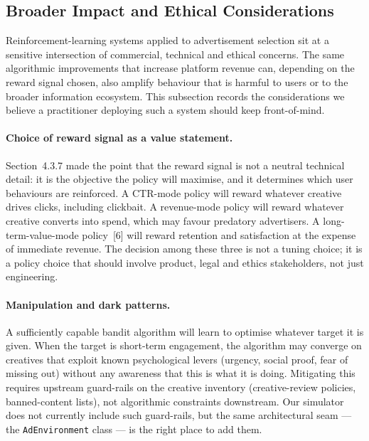 \subsection{Broader Impact and Ethical Considerations}
Reinforcement-learning systems applied to advertisement selection sit at a sensitive intersection of commercial, technical and ethical concerns. The same algorithmic improvements that increase platform revenue can, depending on the reward signal chosen, also amplify behaviour that is harmful to users or to the broader information ecosystem. This subsection records the considerations we believe a practitioner deploying such a system should keep front-of-mind.

\paragraph{Choice of reward signal as a value statement.}
Section~4.3.7 made the point that the reward signal is not a neutral technical detail: it is the objective the policy will maximise, and it determines which user behaviours are reinforced. A CTR-mode policy will reward whatever creative drives clicks, including clickbait. A revenue-mode policy will reward whatever creative converts into spend, which may favour predatory advertisers. A long-term-value-mode policy~[6] will reward retention and satisfaction at the expense of immediate revenue. The decision among these three is not a tuning choice; it is a policy choice that should involve product, legal and ethics stakeholders, not just engineering.

\paragraph{Manipulation and dark patterns.}
A sufficiently capable bandit algorithm will learn to optimise whatever target it is given. When the target is short-term engagement, the algorithm may converge on creatives that exploit known psychological levers (urgency, social proof, fear of missing out) without any awareness that this is what it is doing. Mitigating this requires upstream guard-rails on the creative inventory (creative-review policies, banned-content lists), not algorithmic constraints downstream. Our simulator does not currently include such guard-rails, but the same architectural seam --- the \texttt{AdEnvironment} class --- is the right place to add them.

